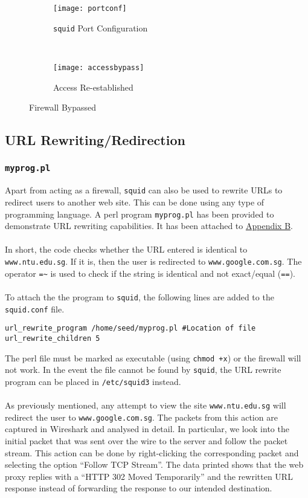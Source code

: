 \documentclass[a4paper,12pt]{article}
\begin{document}
\begin{figure}[H]
\begin{subfigure}{1\textwidth}
\centering
\texttt{[image: portconf]}
\caption{\texttt{squid} Port Configuration}
\label{fig:squidport}
\end{subfigure}
\\
\begin{subfigure}{1\textwidth}
\centering
\texttt{[image: accessbypass]}
\caption{Access Re-established}
\label{fig:bypasssquid}
\end{subfigure}
\caption{Firewall Bypassed}
\end{figure}
\subsection{URL Rewriting/Redirection}
\subsubsection{\texttt{myprog.pl}}
Apart from acting as a firewall, \texttt{squid} can also be used to rewrite URLs to redirect users to another web site. This can be done using any type of programming language. A perl program \texttt{myprog.pl} has been provided to demonstrate URL rewriting capabilities. It has been attached to \hyperref[ch:AppB]{Appendix B}.\\\\In short, the code checks whether the URL entered is identical to \texttt{www.ntu.edu.sg}. If it is, then the user is redirected to \texttt{www.google.com.sg}. The operator \texttt{=\~} is used to check if the string is identical and not exact/equal (\texttt{==}).\\\\To attach the the program to \texttt{squid}, the following lines are added to the \texttt{squid.conf} file.
\begin{verbatim}
url_rewrite_program /home/seed/myprog.pl #Location of file
url_rewrite_children 5
\end{verbatim}
The perl file must be marked as executable (using \texttt{chmod +x}) or the firewall will not work. In the event the file cannot be found by \texttt{squid}, the URL rewrite program can be placed in \texttt{/etc/squid3} instead. \\\\
As previously mentioned, any attempt to view the site \texttt{www.ntu.edu.sg} will redirect the user to \texttt{www.google.com.sg}. The packets from this action are captured in Wireshark and analysed in detail. In particular, we look into the initial packet that was sent over the wire to the server and follow the packet stream. This action can be done by right-clicking the corresponding packet and selecting the option ``Follow TCP Stream''. The data printed shows that the web proxy replies with a ``HTTP 302 Moved Temporarily'' and the rewritten URL response instead of forwarding the response to our intended destination.
\end{document}
